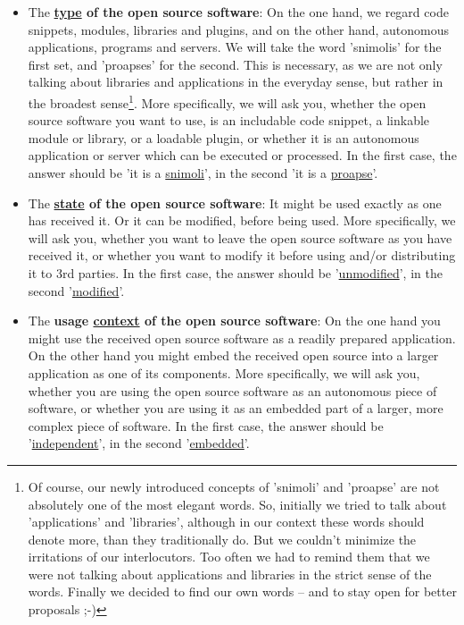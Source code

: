 \label{OsucTokens}
\begin{itemize}
  \item The \textbf{\underline{type} of the open source software}: On the one
  hand, we regard code snippets, modules, libraries and plugins, and on the
  other hand, autonomous applications, programs and servers. We will take the
  word ’snimolis’ for the first set, and ’proapses’ for the second. This is
  necessary, as we are not only talking about libraries and applications in the
  everyday sense, but rather in the broadest sense\footnote{Of course, our newly
  introduced concepts of 'snimoli' and 'proapse' are not absolutely one of the
  most elegant words. So, initially we tried to talk about 'applications' and
  'libraries', although in our context these words should denote more, than they
  traditionally do. But we couldn't minimize the irritations of our
  interlocutors. Too often we had to remind them that we were not talking about
  applications and libraries in the strict sense of the words. Finally we
  decided to find our own words -- and to stay open for better proposals ;-) }.
  More specifically, we will ask you, whether the open source software you want
  to use, is an includable code snippet, a linkable module or library, or a
  loadable plugin, or whether it is an autonomous application or server which
  can be executed or processed. In the first case, the answer should be 'it is a
  \underline{snimoli}', in the second 'it is a \underline{proapse}'.

  \item The \textbf{\underline{state} of the open source software}: It might be
  used exactly as one has received it. Or it can be modified, before being used.
  More specifically, we will ask you, whether you want to leave the open source
  software as you have received it, or whether you want to modify it before
  using and/or distributing it to 3rd parties. In the first case, the answer
  should be '\underline{unmodified}', in the second '\underline{modified}'.
  
  \item The \textbf{usage \underline{context} of the open source
  software}: On the one hand you might use the received open source software as a
  readily prepared application. On the other hand you might embed the received
  open source into a larger application as one of its components. More
  specifically, we will ask you, whether you are using the open source
  software as an autonomous piece of software, or whether you are using it as an
  embedded part of a larger, more complex piece of software. In the first case,
  the answer should be '\underline{independent}', in the second
  '\underline{embedded}'.
  

\end{itemize}

